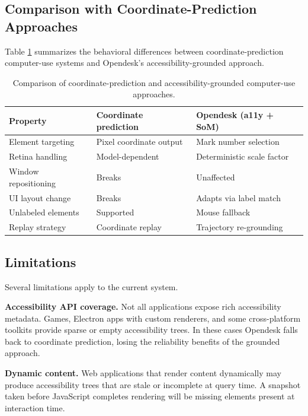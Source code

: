 \documentclass[11pt]{article}
\begin{document}
\subsection{Comparison with Coordinate-Prediction Approaches}

Table \ref{tab:comparison} summarizes the behavioral differences between coordinate-prediction computer-use systems and Opendesk's accessibility-grounded approach.

\begin{table}[h]
\centering
\begin{tabular}{lll}
\toprule
\textbf{Property} & \textbf{Coordinate prediction} & \textbf{Opendesk (a11y + SoM)} \\
\midrule
Element targeting & Pixel coordinate output & Mark number selection \\
Retina handling & Model-dependent & Deterministic scale factor \\
Window repositioning & Breaks & Unaffected \\
UI layout change & Breaks & Adapts via label match \\
Unlabeled elements & Supported & Mouse fallback \\
Replay strategy & Coordinate replay & Trajectory re-grounding \\
\bottomrule
\end{tabular}
\caption{Comparison of coordinate-prediction and accessibility-grounded computer-use approaches.}
\label{tab:comparison}
\end{table}

\subsection{Limitations}

Several limitations apply to the current system.

\textbf{Accessibility API coverage.} Not all applications expose rich accessibility metadata. Games, Electron apps with custom renderers, and some cross-platform toolkits provide sparse or empty accessibility trees. In these cases Opendesk falls back to coordinate prediction, losing the reliability benefits of the grounded approach.

\textbf{Dynamic content.} Web applications that render content dynamically may produce accessibility trees that are stale or incomplete at query time. A snapshot taken before JavaScript completes rendering will be missing elements present at interaction time.
\end{document}
